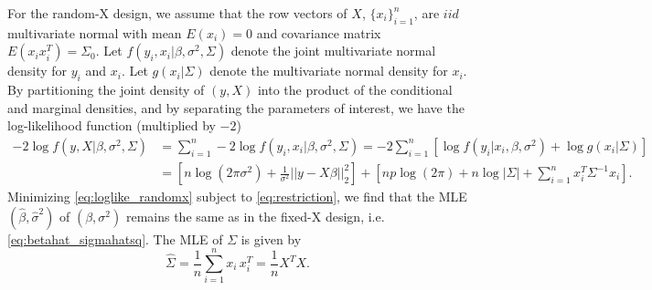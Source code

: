 For the random-X design, we assume that the row vectors of $X$, $\{x_i\}_{i=1}^n$, are $iid$ multivariate normal with mean $E(x_i)=0$ and covariance matrix $E(x_i x_i^T)=\Sigma_0$. Let $f(y_i,x_i|\beta,\sigma^2,\Sigma)$ denote the joint multivariate normal density for $y_i$ and $x_i$. Let $g(x_i|\Sigma)$ denote the multivariate normal density for $x_i$. By partitioning the joint density of $(y,X)$ into the product of the conditional and marginal densities, and by separating the parameters of interest, we have the log-likelihood function (multiplied by $-2$)
\begin{equation}
\begin{aligned}
-2 \log f(y, X|\beta,\sigma^2,\Sigma) &= \sum_{i=1}^n -2 \log f(y_i, x_i|\beta,\sigma^2,\Sigma) = -2 \sum_{i=1}^n [\log f(y_i|x_i,\beta,\sigma^2) + \log g(x_i|\Sigma)] \\
&= \left [ n \log (2\pi \sigma^2) + \frac{1}{\sigma^2} || y-X\beta||_2^2 \right ] + \left [np \log(2\pi) + n \log |\Sigma| + \sum_{i=1}^n x_i^T \Sigma^{-1} x_i \right ].
\end{aligned}
\label{eq:loglike_randomx}
\end{equation}
Minimizing \eqref{eq:loglike_randomx} subject to \eqref{eq:restriction}, we find that the MLE $(\hat{\beta}, \hat{\sigma}^2)$ of $(\beta, \sigma^2)$ remains the same as in the fixed-X design, i.e. \eqref{eq:betahat_sigmahatsq}. The MLE of $\Sigma$ is given by
\begin{equation*}
\hat \Sigma = \frac{1}{n} \sum_{i=1}^n x_i \, x_i^T = \frac{1}{n} X^T X.
\end{equation*}

